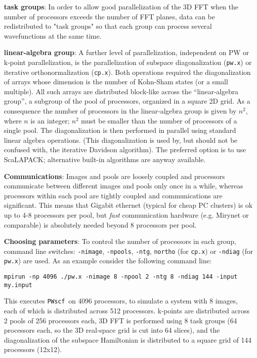\documentclass[12pt,a4paper]{article}
\def\pwx{\texttt{pw.x}}
\def\cpx{\texttt{cp.x}}
\def\PWscf{\texttt{PWscf}}
\begin{document}
{\bf task groups}: 
In order to allow good parallelization of the 3D FFT when 
the number of processors exceeds the number of FFT planes,
data can be redistributed to "task groups" so that each group 
can process several wavefunctions at the same time.

{\bf linear-algebra group}:
A further level of parallelization, independent on
PW or k-point parallelization, is the parallelization of
subspace diagonalization (\pwx) or iterative orthonormalization
(\cpx). Both operations required the diagonalization of 
arrays whose dimension is the number of Kohn-Sham states
(or a small multiple). All such arrays are distributed block-like
across the ``linear-algebra group'', a subgroup of the pool of processors,
organized in a square 2D grid. As a consequence the number of processors
in the linear-algebra group is given by $n^2$, where $n$ is an integer;
$n^2$ must be smaller than the number of processors of a single pool.
The diagonalization is then performed
in parallel using standard linear algebra operations.
(This diagonalization is used by, but should not be confused with,
the iterative Davidson algorithm). The preferred option is to use
ScaLAPACK; alternative built-in algorithms are anyway available.

{\bf Communications}:
Images and pools are loosely coupled and processors communicate
between different images and pools only once in a while, whereas
processors within each pool are tightly coupled and communications
are significant. This means that Gigabit ethernet (typical for
cheap PC clusters) is ok up to 4-8 processors per pool, but {\em fast}
communication hardware (e.g. Mirynet or comparable) is absolutely 
needed beyond 8 processors per pool.

{\bf Choosing parameters}:
To control the number of processors in each group,
command line switches: \texttt{-nimage}, \texttt{-npools},
\texttt{-ntg}, \texttt{northo} (for \cpx) or \texttt{-ndiag}
(for \pwx) are used.
As an example consider the following command line:
\begin{verbatim}
mpirun -np 4096 ./pw.x -nimage 8 -npool 2 -ntg 8 -ndiag 144 -input my.input
\end{verbatim}
This executes \PWscf\ on 4096 processors, to simulate a system
with 8 images, each of which is distributed across 512 processors.
k-points are distributed across 2 pools of 256 processors each, 
3D FFT is performed using 8 task groups (64 processors each, so
the 3D real-space grid is cut into 64 slices), and the diagonalization
of the subspace Hamiltonian is distributed to a square grid of 144
processors (12x12).
\end{document}
